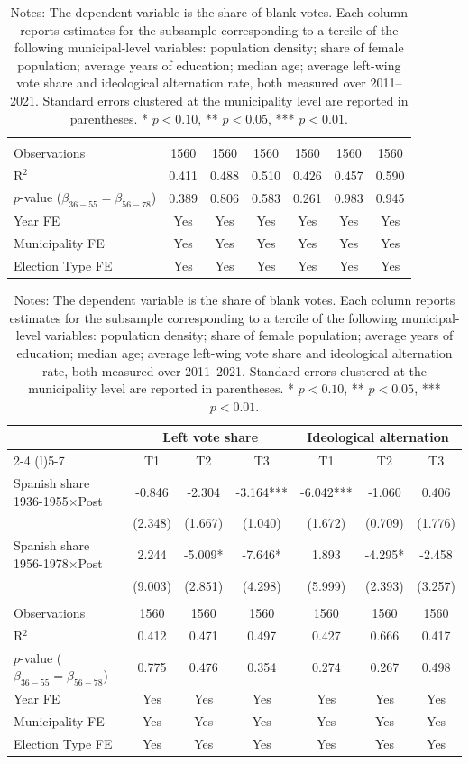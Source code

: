 \begin{table}[!h]
\begin{tabular*}{\textwidth}{l@{\extracolsep{\fill}}cccccc}
 & & & & & & \\
Observations & 1560 & 1560 & 1560 & 1560 & 1560 & 1560\\
R$^2$ & 0.411 & 0.488 & 0.510 & 0.426 & 0.457 & 0.590\\
$p$-value ($\beta_{36{-}55} = \beta_{56{-}78}$) & 0.389 & 0.806 & 0.583 & 0.261 & 0.983 & 0.945\\
Year FE & Yes & Yes & Yes & Yes & Yes & Yes\\
Municipality FE & Yes & Yes & Yes & Yes & Yes & Yes\\
Election Type FE & Yes & Yes & Yes & Yes & Yes & Yes\\
\hline
\end{tabular*}
\begin{tabular*}{\textwidth}{l@{\extracolsep{\fill}}cccccc}
 & \multicolumn{3}{c}{Left vote share} & \multicolumn{3}{c}{Ideological alternation} \\
\cmidrule(l){2-4} \cmidrule(l){5-7}
  & T1 & T2 & T3 & T1  & T2  & T3 \\
\hline
Spanish share 1936-1955$\times$Post & -0.846 & -2.304 & -3.164*** & -6.042*** & -1.060 & 0.406\\
 & (2.348) & (1.667) & (1.040) & (1.672) & (0.709) & (1.776)\\
Spanish share 1956-1978$\times$Post & 2.244 & -5.009* & -7.646* & 1.893 & -4.295* & -2.458\\
 & (9.003) & (2.851) & (4.298) & (5.999) & (2.393) & (3.257)\\

 & & & & & & \\
Observations & 1560 & 1560 & 1560 & 1560 & 1560 & 1560\\
R$^2$ & 0.412 & 0.471 & 0.497 & 0.427 & 0.666 & 0.417\\
$p$-value ($\beta_{36{-}55} = \beta_{56{-}78}$) & 0.775 & 0.476 & 0.354 & 0.274 & 0.267 & 0.498\\
Year FE & Yes & Yes & Yes & Yes & Yes & Yes\\
Municipality FE & Yes & Yes & Yes & Yes & Yes & Yes\\
Election Type FE & Yes & Yes & Yes & Yes & Yes & Yes\\
\hline
\end{tabular*}
\addvspace{0.3em}
\captionsetup{font=footnotesize, justification=justified, singlelinecheck=false}
\caption*{Notes: The dependent variable is the share of blank votes. Each column reports estimates for the subsample corresponding to a tercile of the following municipal-level variables: population density; share of female population; average years of education; median age; average left-wing vote share and ideological alternation rate, both measured over 2011–2021. Standard errors clustered at the municipality level are reported in parentheses. * $p<0.10$, ** $p<0.05$, *** $p<0.01$.}
\end{table}
